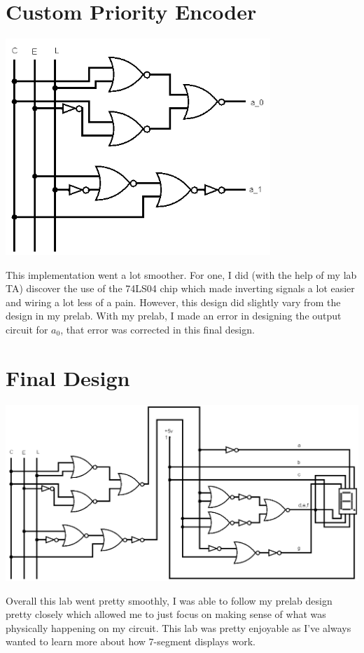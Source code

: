 \documentclass[11pt]{article}
\begin{document}
\section*{Custom Priority Encoder}
\begin{center}
\includegraphics[width=10cm, keepaspectratio]{Encoder}\newline
\end{center}
This implementation went a lot smoother. For one, I did (with the help of my lab TA) discover the use of the 74LS04 chip which made inverting signals a lot easier and wiring a lot less of a pain.
However, this design did slightly vary from the design in my prelab. With my prelab, I made an error in designing the output circuit for $a_0$, that error was corrected in this final design.
\newpage
\section*{Final Design}
\begin{center}
\includegraphics[width=14cm, keepaspectratio]{Final}\newline
\end{center}
Overall this lab went pretty smoothly, I was able to follow my prelab design pretty closely which allowed me to just focus on making sense of what was physically happening on my circuit. This lab was pretty enjoyable as I've always wanted to learn more about how 7-segment displays work.
\end{document}
